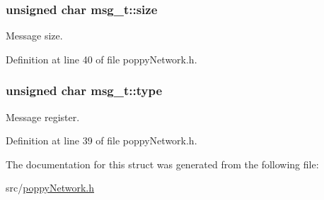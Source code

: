 \hypertarget{structmsg__t_a3736f2ca203e665223b225ca07def9b5}{
\subsubsection[{size}]{\setlength{\rightskip}{0pt plus 5cm}unsigned char msg\-\_\-t\-::size}}\label{structmsg__t_a3736f2ca203e665223b225ca07def9b5}
Message size. 

Definition at line 40 of file poppy\-Network.\-h.

\hypertarget{structmsg__t_ab5695ddf57fd2834cdfe4b6f6e89fc3e}{
\subsubsection[{type}]{\setlength{\rightskip}{0pt plus 5cm}unsigned char msg\-\_\-t\-::type}}\label{structmsg__t_ab5695ddf57fd2834cdfe4b6f6e89fc3e}
Message register. 

Definition at line 39 of file poppy\-Network.\-h.



The documentation for this struct was generated from the following file\-:\begin{DoxyCompactItemize}
\item 
src/\hyperlink{poppy_network_8h}{poppy\-Network.\-h}\end{DoxyCompactItemize}
